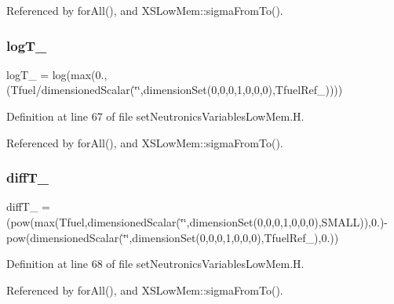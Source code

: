 Referenced by for\+All(), and X\+S\+Low\+Mem\+::sigma\+From\+To().

\mbox{\label{setNeutronicsVariablesLowMem_8H_a7d8ac8fbf68a6681530b7d4920e37f95}} 
\subsubsection{\texorpdfstring{log\+T\+\_\+}{logT\_}}
{\footnotesize\ttfamily log\+T\+\_\+ = log(max(0.,(Tfuel/dimensioned\+Scalar(\char`\"{}\char`\"{},dimension\+Set(0,0,0,1,0,0,0),Tfuel\+Ref\+\_\+))))}



Definition at line 67 of file set\+Neutronics\+Variables\+Low\+Mem.\+H.



Referenced by for\+All(), and X\+S\+Low\+Mem\+::sigma\+From\+To().

\mbox{\label{setNeutronicsVariablesLowMem_8H_a5237d6901ad5467f72c09eb6f926d4dd}} 
\subsubsection{\texorpdfstring{diff\+T\+\_\+}{diffT\_}}
{\footnotesize\ttfamily diff\+T\+\_\+ = (pow(max(Tfuel,dimensioned\+Scalar(\char`\"{}\char`\"{},dimension\+Set(0,0,0,1,0,0,0),S\+M\+A\+LL)),0.)-\/pow(dimensioned\+Scalar(\char`\"{}\char`\"{},dimension\+Set(0,0,0,1,0,0,0),Tfuel\+Ref\+\_\+),0.))}



Definition at line 68 of file set\+Neutronics\+Variables\+Low\+Mem.\+H.



Referenced by for\+All(), and X\+S\+Low\+Mem\+::sigma\+From\+To().

